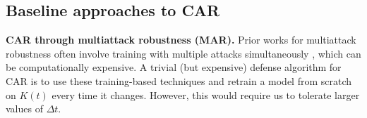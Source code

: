 


\subsection{Baseline approaches to CAR}
\noindent
\textbf{CAR through multiattack robustness (MAR). }Prior works for multiattack robustness often involve training with multiple attacks simultaneously \citep{TB19, MainiWK20}, which can be computationally expensive. A trivial (but expensive) defense algorithm for CAR is to use these training-based techniques and retrain a model from scratch on $K(t)$ every time it changes.  However, this would require us to tolerate larger values of $\Delta t$. %

